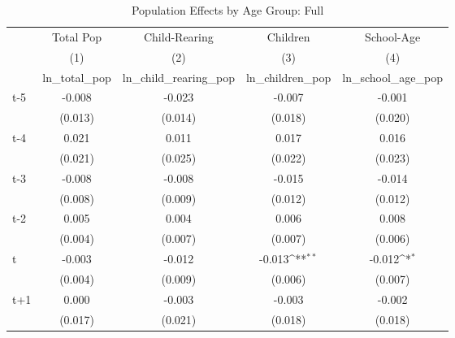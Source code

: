 \begin{table}[htbp]\centering
\def\sym#1{\ifmmode^{#1}\else\(^{#1}\)\fi}
\caption{Population Effects by Age Group: Full}
\begin{tabular}{l*{4}{c}}
\hline\hline
            &\multicolumn{1}{c}{Total Pop}&\multicolumn{1}{c}{Child-Rearing}&\multicolumn{1}{c}{Children}&\multicolumn{1}{c}{School-Age}\\\cmidrule(lr){2-2}\cmidrule(lr){3-3}\cmidrule(lr){4-4}\cmidrule(lr){5-5}
            &\multicolumn{1}{c}{(1)}&\multicolumn{1}{c}{(2)}&\multicolumn{1}{c}{(3)}&\multicolumn{1}{c}{(4)}\\
            &\multicolumn{1}{c}{ln\_total\_pop}&\multicolumn{1}{c}{ln\_child\_rearing\_pop}&\multicolumn{1}{c}{ln\_children\_pop}&\multicolumn{1}{c}{ln\_school\_age\_pop}\\
\hline
t-5         &      -0.008         &      -0.023         &      -0.007         &      -0.001         \\
            &     (0.013)         &     (0.014)         &     (0.018)         &     (0.020)         \\
[1em]
t-4         &       0.021         &       0.011         &       0.017         &       0.016         \\
            &     (0.021)         &     (0.025)         &     (0.022)         &     (0.023)         \\
[1em]
t-3         &      -0.008         &      -0.008         &      -0.015         &      -0.014         \\
            &     (0.008)         &     (0.009)         &     (0.012)         &     (0.012)         \\
[1em]
t-2         &       0.005         &       0.004         &       0.006         &       0.008         \\
            &     (0.004)         &     (0.007)         &     (0.007)         &     (0.006)         \\
[1em]
t           &      -0.003         &      -0.012         &      -0.013\sym{**} &      -0.012\sym{*}  \\
            &     (0.004)         &     (0.009)         &     (0.006)         &     (0.007)         \\
[1em]
t+1         &       0.000         &      -0.003         &      -0.003         &      -0.002         \\
            &     (0.017)         &     (0.021)         &     (0.018)         &     (0.018)         \\

\end{tabular}
\end{table}
